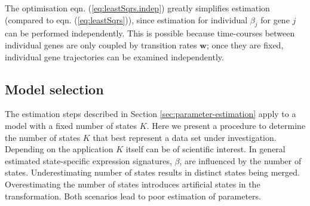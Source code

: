 The optimisation eqn. (\ref{eq:leastSqrs.indep}) greatly simplifies estimation (compared to  eqn. (\ref{eq:leastSqrs})), since estimation for individual $\beta_j$ for gene $j$ can be performed independently. This is possible because time-courses between individual genes are only coupled by transition rates $\mathbf{w}$; once they are fixed, individual gene trajectories can be examined independently. 

\subsection{Model selection}
\label{sec:model-selection}

The estimation steps described in Section \ref{sec:parameter-estimation} apply to a model with a fixed number of states $K$. Here we present a procedure to determine the number of states $K$ that best represent a data set under investigation. Depending on the application $K$ itself can be of scientific interest. In general estimated state-specific expression signatures, $\beta$, are influenced by the number of states. Underestimating number of states results in distinct states being merged. Overestimating the number of states introduces artificial states in the transformation. Both scenarios lead to poor estimation of parameters. 

